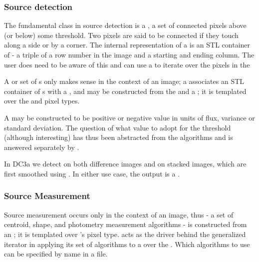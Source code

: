 \subsubsection{Source detection}

The fundamental class in source detection is a , a set of 
connected pixels above (or below) some threshold. Two pixels are said to be 
connected if they touch along a side or by a corner. The internal 
representation of a  is an STL container of  - 
a triple of a row number in the image and a starting and ending column. The 
user does need to be aware of this and can use a  to
iterate over the pixels in the 

A  or set of s only makes sense in the 
context of an image; a  associates an STL container of 
s with a , and may be constructed from 
the  and a ; it is templated over the 
 and  pixel types.

A  may be constructed to be positive or negative value in 
units of flux, variance or standard deviation. The question of what value to 
adopt for the threshold (although interesting) has thus been abstracted from 
the algorithms and is answered separately by . 

In DC3a we detect on both difference images and on stacked images, which are 
first smoothed using . In either use case, the output
is a .

\subsubsection{Source Measurement}

Source measurement occurs only in the context of an image, thus 
 - a set of centroid, shape, and photometry measurement 
algorithms - is constructed from an ; it is templated over 
's pixel type.   acts as the driver behind
the generalized  iterator  in applying 
its set of algorithms to a  over the . 
Which algorithms to use can be specified by name in a  file.


